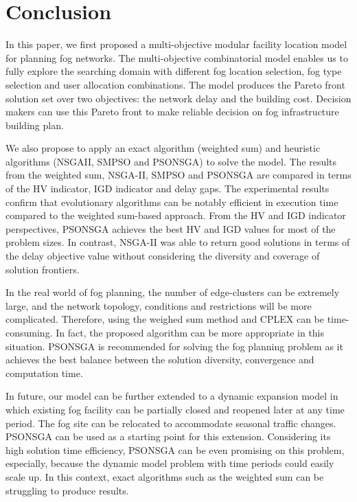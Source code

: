 \documentclass[10pt,journal,compsoc]{IEEEtran}
\begin{document}

\section{Conclusion}\label{conclu}
In this paper, we first proposed a multi-objective modular facility location model for planning fog networks. The multi-objective combinatorial model enables us to fully explore the searching domain with different fog location selection, fog type selection and user allocation combinations. The model produces the Pareto front solution set over two objectives: the network delay and the building cost. Decision makers can use this Pareto front to make reliable decision on fog infrastructure building plan. 

We also propose to apply an exact algorithm (weighted sum) and heuristic algorithms (NSGAII, SMPSO and PSONSGA) to solve the model. The results from the weighted sum, NSGA-II, SMPSO and PSONSGA are compared in terms of the HV indicator, IGD indicator and delay gaps. The experimental results confirm that evolutionary algorithms can be notably efficient in execution time compared to the weighted sum-based approach. From the HV and IGD indicator perspectives, PSONSGA achieves the best HV and IGD values for most of the problem sizes. In contrast, NSGA-II was able to return good solutions in terms of the delay objective value without considering the diversity and coverage of solution frontiers.

In the real world of fog planning, the number of edge-clusters can be extremely large, and the network topology, conditions and restrictions will be more complicated. Therefore, using the weighed sum method and CPLEX can be time-consuming. In fact, the proposed algorithm can be more appropriate in this situation. PSONSGA is recommended for solving the fog planning problem as it achieves the best balance between the solution diversity, convergence and computation time.

In future, our model can be further extended to a dynamic expansion model in which existing fog facility can be partially closed and reopened later at any time period. The fog site can be relocated to accommodate seasonal traffic changes. PSONSGA can be used as a starting point for this extension. Considering its high solution time efficiency, PSONSGA can be even promising on this problem, especially, because the dynamic model problem with time periods could easily scale up. In this context, exact algorithms such as the weighted sum can be struggling to produce results.
\end{document}
